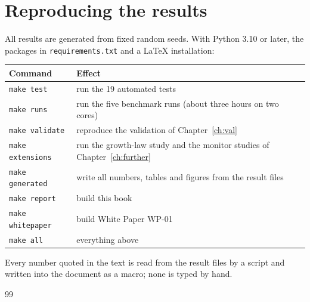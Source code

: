\documentclass[11pt,a4paper,twoside,openany]{book}
\theoremstyle{plain}\newtheorem{proposition}{Proposition}\newtheorem{corollary}{Corollary}
\theoremstyle{definition}\newtheorem{definition}{Definition}[chapter]
\begin{document}
\chapter{Reproducing the results}\label{app:repro}
All results are generated from fixed random seeds. With Python 3.10 or later, the packages in \texttt{requirements.txt} and a LaTeX installation:
\begin{center}\begin{tabular}{@{}ll@{}}\toprule\rowcolor{dghead}
Command & Effect\\\midrule
\texttt{make test} & run the 19 automated tests\\
\texttt{make runs} & run the five benchmark runs (about three hours on two cores)\\
\texttt{make validate} & reproduce the validation of Chapter~\ref{ch:val}\\
\texttt{make extensions} & run the growth-law study and the monitor studies of Chapter~\ref{ch:further}\\
\texttt{make generated} & write all numbers, tables and figures from the result files\\
\texttt{make report} & build this book\\
\texttt{make whitepaper} & build White Paper WP-01\\
\texttt{make all} & everything above\\
\bottomrule\end{tabular}\end{center}
Every number quoted in the text is read from the result files by a script and written into the document as a macro; none is typed by hand.

\backmatter
\renewcommand{\bibname}{References}
{\small
\begin{thebibliography}{99}
\setlength{\itemsep}{1pt}

\end{thebibliography}}
\clearpage

\end{document}
